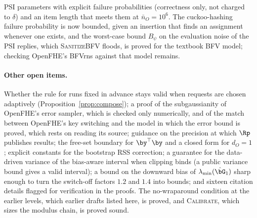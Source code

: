 \item PSI parameters with explicit failure probabilities (correctness only, not charged to $\delta$) and an item length that meets them at $\bar n_O = 10^6$. The cuckoo-hashing failure probability is now bounded, given an insertion that finds an assignment whenever one exists, and the worst-case bound $B_\psi$ on the evaluation noise of the PSI replies, which \textsc{SanitizeBFV} floods, is proved for the textbook BFV model; checking OpenFHE's BFVrns against that model remains.

\paragraph{Other open items.} Whether the rule for runs fixed in advance stays valid when requests are chosen adaptively (Proposition~\ref{prop:compose}); a proof of the subgaussianity of OpenFHE's error sampler, which is checked only numerically, and of the match between OpenFHE's key switching and the model in which the error bound is proved, which rests on reading its source; guidance on the precision at which $\Rp$ publishes results; the free-set boundary for $\by^\top\by$ and a closed form for $d_O = 1$; explicit constants for the bootstrap RSS correction; a guarantee for the data-driven variance of the bias-aware interval when clipping binds (a public variance bound gives a valid interval); a bound on the downward bias of $\lambda_{\min}(\hat\bG_1)$ sharp enough to turn the switch-off factors $1.2$ and $1.4$ into bounds; and sixteen citation details flagged for verification in the proofs. The no-wraparound condition at the earlier levels, which earlier drafts listed here, is proved, and \textsc{Calibrate}, which sizes the modulus chain, is proved sound.

